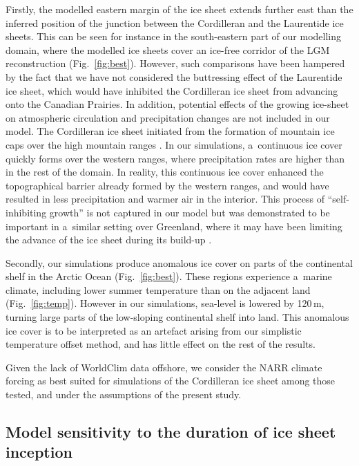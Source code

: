 \documentclass[tc, ms]{copernicus}
\begin{document}
Firstly, the modelled eastern margin of the ice sheet extends further east than the inferred position of the junction between the Cordilleran and the Laurentide ice sheets. This can be seen for instance in the south-eastern part of our modelling domain, where the modelled ice sheets cover an ice-free corridor of the LGM reconstruction (Fig.~\ref{fig:best}). However, such comparisons have been hampered by the fact that we have not considered the buttressing effect of the Laurentide ice sheet, which would have inhibited the Cordilleran ice sheet from advancing onto the Canadian Prairies. In addition, potential effects of the growing ice-sheet on atmospheric circulation and precipitation changes are not included in our model. The Cordilleran ice sheet initiated from the formation of mountain ice caps over the high mountain ranges \citep{clague-1989}. In our simulations, a~continuous ice cover quickly forms over the western ranges, where precipitation rates are higher than in the rest of the domain. In reality, this continuous ice cover enhanced the topographical barrier already formed by the western ranges, and would have resulted in less precipitation and warmer air in the interior. This process of ``self-inhibiting growth'' is not captured in our model but was demonstrated to be important in a~similar setting over Greenland, where it may have been limiting the advance of the ice sheet during its build-up \citep{langen-etal-2012}.

Secondly, our simulations produce anomalous ice cover on parts of the continental shelf in the Arctic Ocean (Fig.~\ref{fig:best}). These regions experience a~marine climate, including lower summer temperature than on the adjacent land (Fig.~\ref{fig:temp}). However in our simulations, sea-level is lowered by 120\,\unit{m}, turning large parts of the low-sloping continental shelf into land. This anomalous ice cover is to be interpreted as an artefact arising from our simplistic temperature offset method, and has little effect on the rest of the results.


Given the lack of WorldClim data offshore, we consider the NARR climate forcing as best suited for simulations of the Cordilleran ice sheet among those tested, and under the assumptions of the present study.

\subsection{Model sensitivity to the duration of ice sheet inception}
\end{document}
